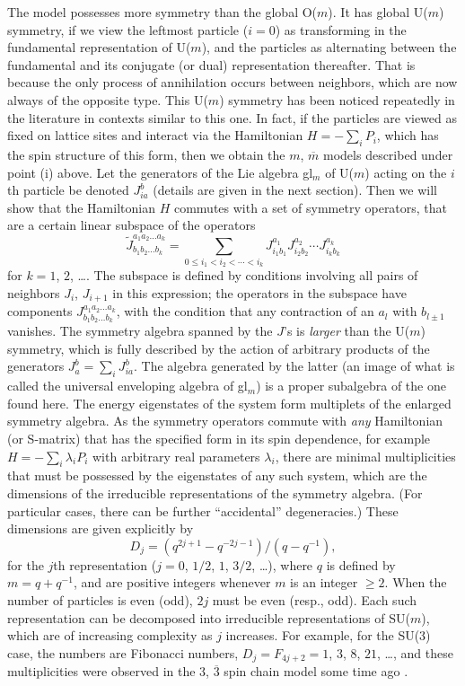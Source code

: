 \documentclass[twocolumn,floats,pra]{revtex4}
\newcommand {\be}{\begin{equation}}
\newcommand {\ee} {\end{equation}}
\begin{document}
The model possesses more symmetry than the global O($m$). It has
global U($m$) symmetry, if we view the leftmost particle ($i=0$)
as transforming in the fundamental representation of U($m$), and
the particles as alternating between the fundamental and its
conjugate (or dual) representation thereafter. That is because the
only process of annihilation occurs between neighbors, which are
now always of the opposite type. This U($m$) symmetry has been
noticed repeatedly in the literature in contexts similar to this
one. In fact, if the particles are viewed as fixed on lattice
sites and interact via the Hamiltonian $H=-\sum_iP_i$, which has
the spin structure of this form, then we obtain the $m$,
$\overline{m}$ models described under point (i) above. Let the
generators of the Lie algebra gl$_m$ of U($m$) acting on the $i$th
particle be denoted $J_{ia}^b$ (details are given in the next
section). Then we will show that the Hamiltonian $H$ commutes with
a set of symmetry operators, that are a certain linear subspace of
the operators%
\be%
\widetilde{J}^{a_1a_2\ldots a_k}_{b_1b_2\ldots b_k}=\sum_{0\leq
i_1<i_2<\cdots <i_k} J_{i_1 b_1}^{a_1}J_{i_2
b_2}^{a_2}\cdots J_{i_k b_k}^{a_k} \ee%
for $k=1$, $2$, \ldots. The subspace is defined by conditions
involving all pairs of neighbors $J_i$, $J_{i+1}$ in this
expression; the operators in the subspace have components
$J^{a_1a_2\ldots a_k}_{b_1b_2\ldots b_k}$, with the condition that
any contraction of an $a_l$ with $b_{l\pm1}$ vanishes. The
symmetry algebra spanned by the $J$'s is {\em larger} than the
U($m$) symmetry, which is fully described by the action of
arbitrary products of the generators $J_a^b=\sum_iJ_{ia}^b$. The
algebra generated by the latter (an image of what is called the
universal enveloping algebra of gl$_m$) is a proper subalgebra of
the one found here. The energy eigenstates of the system form
multiplets of the enlarged symmetry algebra. As the symmetry
operators commute with {\em any} Hamiltonian (or S-matrix) that
has the specified form in its spin dependence, for example
$H=-\sum_i \lambda_iP_i$ with arbitrary real parameters
$\lambda_i$, there are minimal multiplicities that must be
possessed by the eigenstates of any such system, which are the
dimensions of the irreducible representations of the symmetry
algebra. (For particular cases, there can be further
``accidental'' degeneracies.) These
dimensions are given explicitly by %
\be%
D_j=(q^{2j+1}-q^{-2j-1})/(q-q^{-1}),\ee%
for the $j$th representation ($j=0$, $1/2$, $1$, $3/2$, \ldots),
where $q$ is defined by $m=q+q^{-1}$, and are positive integers
whenever $m$ is an integer $\geq 2$. When the number of particles
is even (odd), $2j$ must be even (resp., odd). Each such
representation can be decomposed into irreducible representations
of SU($m$), which are of increasing complexity as $j$ increases.
For example, for the SU(3) case, the numbers are Fibonacci
numbers, $D_j=F_{4j+2}=1$, $3$, $8$, $21$, \ldots, and these
multiplicities were observed in the $3$, $\overline{3}$ spin chain
model some time ago \cite{ha}.
\end{document}
